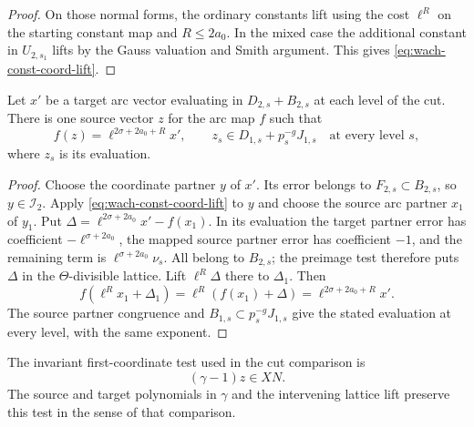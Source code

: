 \begin{proof}
On those normal forms, the ordinary constants lift using the
cost \(\ell^R\) on the starting constant map and \(R\le2a_0\).
In the mixed case the additional constant in \(U_{2,s_1}\)
lifts by the Gauss valuation and Smith argument. This gives
\eqref{eq:wach-const-coord-lift}.
\end{proof}

\begin{lemma}
Let \(x'\) be a target arc vector evaluating in \(D_{2,s}+B_{2,s}\)
at each level of the cut. There is one source vector \(z\) for the arc map \(f\) such that
\[
 f(z)=\ell^{2\sigma+2a_0+R}x',\qquad z_s\in D_{1,s}+p_s^{-g}J_{1,s}\quad\text{at every level }s,
\]
where \(z_s\) is its evaluation.
\end{lemma}
\begin{proof}
Choose the coordinate partner \(y\) of \(x'\). Its error belongs
to \(F_{2,s}\subset B_{2,s}\), so \(y\in\mathcal I_2\).
Apply \eqref{eq:wach-const-coord-lift} to \(y\) and choose the
source arc partner \(x_1\) of \(y_1\). Put
\(\Delta=\ell^{2\sigma+2a_0}x'-f(x_1)\).
In its evaluation the target partner error has coefficient
\(-\ell^{\sigma+2a_0}\), the mapped source partner error has
coefficient \(-1\), and the remaining term is
\(\ell^{\sigma+2a_0}\nu_s\). All belong to \(B_{2,s}\);
the preimage test therefore puts \(\Delta\) in the
\(\Theta\)-divisible lattice. Lift \(\ell^R\Delta\) there to
\(\Delta_1\). Then
\[
 f(\ell^Rx_1+\Delta_1)
 =\ell^R(f(x_1)+\Delta)=\ell^{2\sigma+2a_0+R}x'.
\]
The source partner congruence and
\(B_{1,s}\subset p_s^{-g}J_{1,s}\) give the stated evaluation
at every level, with the same exponent.
\end{proof}
\begin{lemma}
The invariant first-coordinate test used in the cut comparison is
\[
 (\gamma-1)z\in XN.
\]
The source and target polynomials in \(\gamma\) and the intervening lattice lift preserve this test in the sense of that comparison.
\end{lemma}
